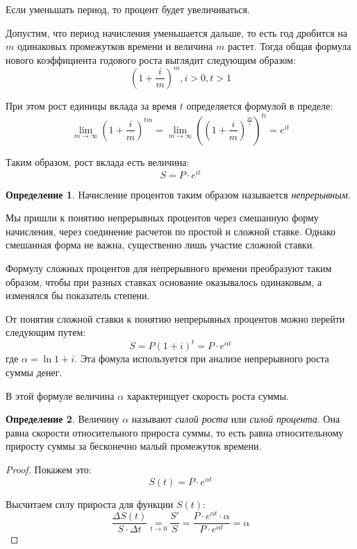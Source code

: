 \documentclass[aps,%
12pt,%
final,%
oneside,
onecolumn,%
musixtex, %
superscriptaddress,%
centertags]{article} %
\theoremstyle{plain}
\theoremstyle{definition}
\newtheorem{definition}{Определение}[subsection]
\theoremstyle{remark}
\begin{document}
Если уменьшать период, то процент будет увеличиваться.

Допустим, что период начисления уменьшается дальше, то есть год дробится на $m$ одинаковых промежутков времени и величина $m$ растет. Тогда общая формула нового коэффициента годового роста выглядит следующим образом:
$$\left(1+\frac{i}{m}\right)^m, i > 0, t >1$$

При этом рост единицы вклада за время $t$ определяется формулой в пределе:
$$\lim\limits_{m \to \infty} \left(1+\frac{i}{m}\right)^{tm} = \lim\limits_{m \to \infty} \left(\left(1+\frac{i}{m}\right)^{\frac{m}{i}}\right)^{ti} = e^{it}$$

Таким образом, рост вклада есть величина:
$$S = P \cdot e^{it}$$

\begin{definition}
	Начисление процентов таким образом называется \textit{непрерывным}.

	Мы пришли к понятию непрерывных процентов через смешанную форму начисления, через соединение расчетов по простой и сложной ставке. Однако смешанная форма не важна, существенно лишь участие сложной ставки.
\end{definition}
Формулу сложных процентов для непрерывного времени преобразуют таким образом, чтобы при разных ставках основание оказывалось одинаковым, а изменялся бы показатель степени.

От понятия сложной ставки к понятию непрерывных процентов можно перейти следующим путем:
$$S = P(1+i)^t = P\cdot e^{\alpha t}$$
где $\alpha = \ln {1+i}$. Эта фомула используется при анализе непрерывного роста суммы денег.

В этой формуле величина $\alpha$ характерищует скорость роста суммы.

\begin{definition}
	Величину $\alpha$ называют \textit{силой роста} или \textit{силой процента}. Она равна скорости относительного прироста суммы, то есть равна относительному приросту суммы за бесконечно малый промежуток времени.
\end{definition}
\begin{proof}
Покажем это:
$$S(t) = P \cdot e^{\alpha t}$$

Высчитаем силу прироста для функции $S(t)$:
$$\frac{\Delta S(t)}{S \cdot \Delta t}\underset{t \to 0}{=}\frac{S'}{S} = \frac{P \cdot e^{\alpha t} \cdot \alpha}{P \cdot e^{\alpha t}} = \alpha$$
\end{proof}

\end{document}
